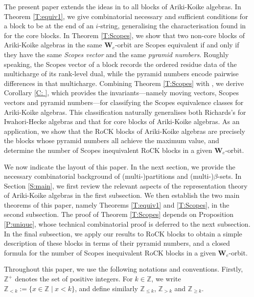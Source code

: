 \documentclass[11pt,a4paper,reqno]{amsart}
\numberwithin{equation}{section}
\theoremstyle{plain}
\theoremstyle{definition}
\theoremstyle{remark}
\numberwithin{equation}{section}
\newcommand{\ZZ}{\mathbb{Z}}
\newcommand{\AW}{\mathbf{W}}
\begin{document}
The present paper extends the ideas in \cite{LQT} to all blocks of Ariki-Koike algebras.
In Theorem \ref{T:equiv1}, we give combinatorial necessary and sufficient conditions for a block to be at the end of an $i$-string, generalising the characterisation found in \cite{LQT} for the core blocks.
In Theorem \ref{T:Scopes}, we show that two non-core blocks of Ariki-Koike algebras in the same $\AW_e$-orbit are Scopes equivalent if and only if they have the same {\em Scopes vector} and the same {\em pyramid numbers}.
Roughly speaking, the Scopes vector of a block records the ordered residue data of the multicharge of its rank-level dual, while the pyramid numbers encode pairwise differences in that multicharge.
Combining Theorem \ref{T:Scopes} with \cite[Theorem 4.24]{LQT}, we derive Corollary \ref{C: }, which provides the invariants---namely moving vectors, Scopes vectors and pyramid numbers---for classifying the Scopes equivalence classes for Ariki-Koike algebras.  
This classification naturally generalises both Richards's for Iwahori-Hecke algebras and that for core blocks of Ariki-Koike algebras. 
As an application, we show that the RoCK blocks of Ariki-Koike algebras are precisely the blocks whose pyramid numbers all achieve the maximum value, and determine the number of Scopes inequivalent RoCK blocks in a given $\AW_e$-orbit.

We now indicate the layout of this paper.
In the next section, we provide the necessary combinatorial background of (multi-)partitions and (multi-)$\beta$-sets.
In Section \ref{S:main}, we first review the relevant aspects of the representation theory of Ariki-Koike algebras in the first subsection.  
We then establish the two main theorems of this paper, namely Theorems \ref{T:equiv1} and \ref{T:Scopes}, in the second subsection. 
The proof of Theorem \ref{T:Scopes} depends on Proposition \ref{P:unique}, whose technical combinatorial proof is deferred to the next subsection.
In the final subsection, we apply our results to RoCK blocks to obtain a simple description of these blocks in terms of their pyramid numbers, and a closed formula for the number of Scopes inequivalent RoCK blocks in a given $\AW_e$-orbit.

Throughout this paper, we use the following notations and conventions.
Firstly, $\mathbb{Z}^+$ denotes the set of positive integers.  
For $k \in \ZZ$, we write $\ZZ_{< k} := \{ x \in \ZZ \mid x < k \}$, and define similarly $\ZZ_{\leq k}$, $\ZZ_{> k}$ and $\ZZ_{\geq k}$.
\end{document}
